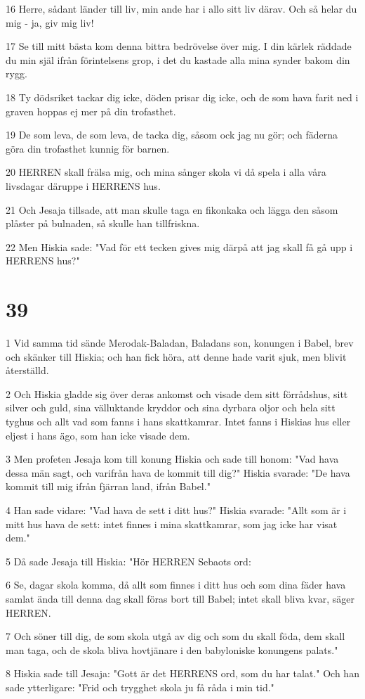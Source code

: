 \par 16 Herre, sådant länder till liv, min ande har i allo sitt liv därav. Och så helar du mig - ja, giv mig liv!
\par 17 Se till mitt bästa kom denna bittra bedrövelse över mig. I din kärlek räddade du min själ ifrån förintelsens grop, i det du kastade alla mina synder bakom din rygg.
\par 18 Ty dödsriket tackar dig icke, döden prisar dig icke, och de som hava farit ned i graven hoppas ej mer på din trofasthet.
\par 19 De som leva, de som leva, de tacka dig, såsom ock jag nu gör; och fäderna göra din trofasthet kunnig för barnen.
\par 20 HERREN skall frälsa mig, och mina sånger skola vi då spela i alla våra livsdagar däruppe i HERRENS hus.
\par 21 Och Jesaja tillsade, att man skulle taga en fikonkaka och lägga den såsom plåster på bulnaden, så skulle han tillfriskna.
\par 22 Men Hiskia sade: "Vad för ett tecken gives mig därpå att jag skall få gå upp i HERRENS hus?"

\chapter{39}

\par 1 Vid samma tid sände Merodak-Baladan, Baladans son, konungen i Babel, brev och skänker till Hiskia; och han fick höra, att denne hade varit sjuk, men blivit återställd.
\par 2 Och Hiskia gladde sig över deras ankomst och visade dem sitt förrådshus, sitt silver och guld, sina välluktande kryddor och sina dyrbara oljor och hela sitt tyghus och allt vad som fanns i hans skattkamrar. Intet fanns i Hiskias hus eller eljest i hans ägo, som han icke visade dem.
\par 3 Men profeten Jesaja kom till konung Hiskia och sade till honom: "Vad hava dessa män sagt, och varifrån hava de kommit till dig?" Hiskia svarade: "De hava kommit till mig ifrån fjärran land, ifrån Babel."
\par 4 Han sade vidare: "Vad hava de sett i ditt hus?" Hiskia svarade: "Allt som är i mitt hus hava de sett: intet finnes i mina skattkamrar, som jag icke har visat dem."
\par 5 Då sade Jesaja till Hiskia: "Hör HERREN Sebaots ord:
\par 6 Se, dagar skola komma, då allt som finnes i ditt hus och som dina fäder hava samlat ända till denna dag skall föras bort till Babel; intet skall bliva kvar, säger HERREN.
\par 7 Och söner till dig, de som skola utgå av dig och som du skall föda, dem skall man taga, och de skola bliva hovtjänare i den babyloniske konungens palats."
\par 8 Hiskia sade till Jesaja: "Gott är det HERRENS ord, som du har talat." Och han sade ytterligare: "Frid och trygghet skola ju få råda i min tid."

